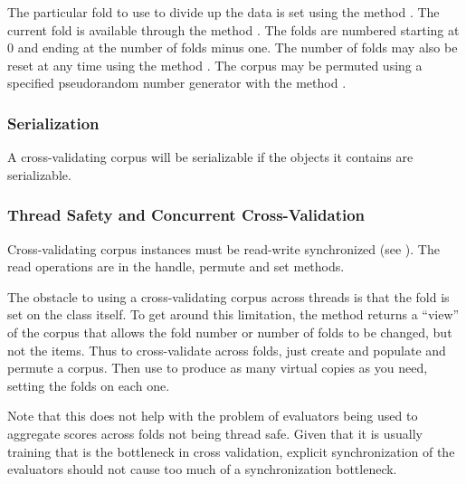 The particular fold to use to divide up the data is set using the
method .  The current fold is available through the
method .  The folds are numbered starting at 0 and ending
at the number of folds minus one.  The number of folds may also be
reset at any time using the method .  The corpus
may be permuted using a specified pseudorandom number generator with
the method .



\subsubsection{Serialization}

A cross-validating corpus will be serializable if the objects
it contains are serializable.  


\subsubsection{Thread Safety and Concurrent Cross-Validation}

Cross-validating corpus instances must be read-write synchronized (see
).  The read operations are in
the handle, permute and set methods.

The obstacle to using a cross-validating corpus across threads is that
the fold is set on the class itself.  To get around this limitation,
the method  returns a ``view'' of the corpus that
allows the fold number or number of folds to be changed, but not the
items.  Thus to cross-validate across folds, just create and populate
and permute a corpus.  Then use  to produce as
many virtual copies as you need, setting the folds on each one.  

Note that this does not help with the problem of evaluators being used
to aggregate scores across folds not being thread safe.  Given that it
is usually training that is the bottleneck in cross validation,
explicit synchronization of the evaluators should not cause too much
of a synchronization bottleneck.











